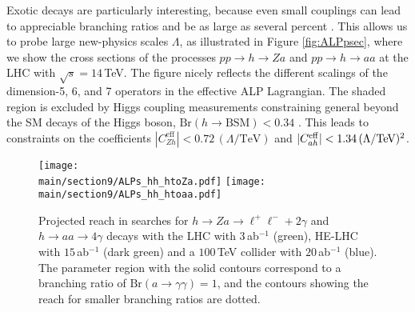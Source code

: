 Exotic decays are particularly interesting, because even small couplings can lead to appreciable branching ratios and be as large as several percent \cite{Bauer:2017nlg, Bauer:2017ris}. 
This allows us to probe large new-physics scales $\Lambda$, as illustrated in Figure \ref{fig:ALPpsec}, where we show the cross sections of the processes $pp \to h \to Z a$ and $pp \to h \to aa$  at the LHC with $\sqrt{s} = 14\,$TeV. The figure nicely reflects the different scalings of the dimension-5, 6, and 7 operators in the effective ALP Lagrangian. The 
shaded region is excluded by Higgs coupling measurements constraining general beyond the SM decays of the Higgs boson, $\text{Br}(h\to\text{BSM})<0.34$ 
\cite{Khachatryan:2016vau}. This leads to constraints on the coefficients $|C_{Zh}^{\textrm{eff}}| < 0.72\,(\Lambda/\textrm{TeV})$ and $|C_{ah}^{\rm eff}| < 1.34\,(\Lambda/\textrm{TeV})^2$. 


%
\begin{figure}[t]
\begin{center}
\texttt{[image: \\main/section9/ALPs\_hh\_htoZa.pdf]}
\texttt{[image: \\main/section9/ALPs\_hh\_htoaa.pdf]}
\end{center}
\vspace{-0mm}
\caption{\label{fig:pphZa} Projected reach in searches for $h \to Za \to \ell^+\ell^-+2\gamma $ and $h \to aa \to 4\gamma $ decays with the LHC with $3$\,ab$^{-1}$
(green), HE-LHC with $15$\,ab$^{-1}$ (dark green) and a $100\,$TeV collider with $20$\,ab$^{-1}$ (blue). The parameter region with the solid contours correspond to a branching ratio of $\text{Br}(a\to 
\gamma\gamma)=1$, and the contours showing the reach for smaller branching ratios are dotted.}
\end{figure}
%


